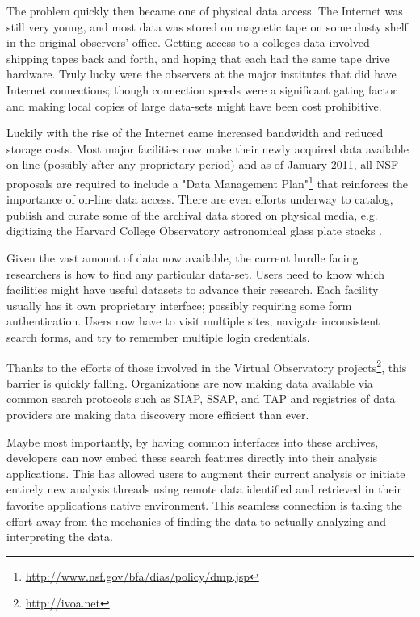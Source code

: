 The problem quickly then became one of physical data access.  The Internet was still very young, and most data was stored on magnetic tape on some dusty shelf in the original observers' office.  Getting access to a colleges data involved shipping tapes back and forth, and hoping that each had the same tape drive hardware.  Truly lucky were the observers at the major institutes that did have Internet connections; though connection speeds were a significant gating factor and making local copies of large data-sets might have been cost prohibitive.

Luckily with the rise of the Internet came increased bandwidth and reduced storage costs.  Most major facilities now make their newly acquired data available on-line (possibly after any proprietary period) and as of January 2011, all NSF proposals are required to include a "Data Management Plan"\footnote{ \url{http://www.nsf.gov/bfa/dias/policy/dmp.jsp}}  that reinforces the importance of on-line data access. There are even efforts underway to catalog, publish and curate some of the archival data stored on physical media, e.g. digitizing the Harvard College Observatory astronomical glass plate stacks \citep{2006vopc.conf...54M}.

Given the vast amount of data now available, the current hurdle facing researchers is how to find any particular data-set.  Users need to know which facilities might have useful datasets to advance their research. Each facility usually has it own proprietary interface; possibly requiring some form authentication.  Users now have to visit multiple sites,  navigate inconsistent search forms, and try to remember multiple login credentials.

Thanks to the efforts of those involved in the Virtual Observatory projects\footnote{ \url{http://ivoa.net}}, this barrier is quickly falling.  Organizations are now making data available via common search protocols such as SIAP, SSAP, and TAP and  registries of data providers are making data discovery more efficient than ever.

Maybe most importantly, by having common interfaces into these archives, developers can now embed these search features directly into their analysis applications.  This has allowed users to augment their current analysis or initiate entirely new analysis threads using remote data  identified and retrieved in their favorite applications native environment.  This seamless connection is taking the effort away from the mechanics of finding the data to actually analyzing and interpreting the data.

